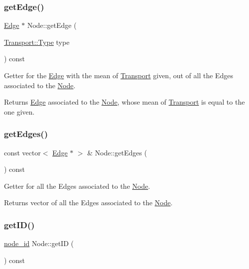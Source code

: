 \subsubsection{\texorpdfstring{get\+Edge()}{getEdge()}\hspace{0.1cm}{\footnotesize\ttfamily [2/2]}}
{\footnotesize\ttfamily \hyperlink{class_edge}{Edge} $\ast$ Node\+::get\+Edge (\begin{DoxyParamCaption}\item[{\hyperlink{class_transport_a1879cecfed0d4238e5a7af6d085db317}{Transport\+::\+Type}}]{type }\end{DoxyParamCaption}) const}

Getter for the \hyperlink{class_edge}{Edge} with the mean of \hyperlink{class_transport}{Transport} given, out of all the Edges associated to the \hyperlink{class_node}{Node}.

\begin{DoxyReturn}{Returns}
\hyperlink{class_edge}{Edge} associated to the \hyperlink{class_node}{Node}, whose mean of \hyperlink{class_transport}{Transport} is equal to the one given. 
\end{DoxyReturn}
\hypertarget{class_node_a10a4e5c428f496080172680cb20ea9e0}{}\label{class_node_a10a4e5c428f496080172680cb20ea9e0} 
\subsubsection{\texorpdfstring{get\+Edges()}{getEdges()}}
{\footnotesize\ttfamily const vector$<$ \hyperlink{class_edge}{Edge} $\ast$ $>$ \& Node\+::get\+Edges (\begin{DoxyParamCaption}{ }\end{DoxyParamCaption}) const}

Getter for all the Edges associated to the \hyperlink{class_node}{Node}.

\begin{DoxyReturn}{Returns}
vector of all the Edges associated to the \hyperlink{class_node}{Node}. 
\end{DoxyReturn}
\hypertarget{class_node_a5e319f5c050c46590bed81fc4dc54325}{}\label{class_node_a5e319f5c050c46590bed81fc4dc54325} 
\subsubsection{\texorpdfstring{get\+I\+D()}{getID()}}
{\footnotesize\ttfamily \hyperlink{_node_8hpp_a9d6265804805c2375068fd7484840dc6}{node\+\_\+id} Node\+::get\+ID (\begin{DoxyParamCaption}{ }\end{DoxyParamCaption}) const}

